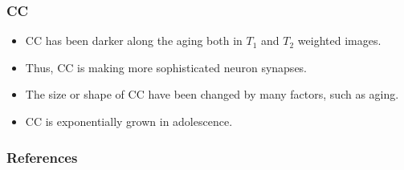 \documentclass{beamer}
\begin{document}
	\begin{frame}
		\frametitle{CC}
		\begin{itemize}
			\item CC has been darker along the aging both in $T_1$ and $T_2$ weighted images. 
			\item Thus, CC is making more sophisticated neuron synapses. 
			\item The size or shape of CC have been changed by many factors, such as aging. \cite{ref:age1}
			\item CC is exponentially grown in adolescence. \cite{ref:grow1, ref:grow2}
		\end{itemize}
	\end{frame}
	
	\begin{frame}[allowframebreaks]
		\frametitle{References}
		
		
	\end{frame}
\end{document}

